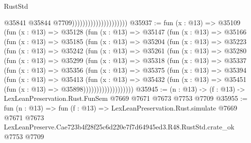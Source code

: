 \begin{lexlean}{RustStd}
\begin{coremodule}
                                              @35841
                                              @35844
                                              @7709)))))))))))))))))))))
@35937 := fun (x : @13) =>
  @35109
    (fun (x : @13) =>
    @35128
      (fun (x : @13) =>
      @35147
        (fun (x : @13) =>
        @35166
          (fun (x : @13) =>
          @35185
            (fun (x : @13) =>
            @35204
              (fun (x : @13) =>
              @35223
                (fun (x : @13) =>
                @35242
                  (fun (x : @13) =>
                  @35261
                    (fun (x : @13) =>
                    @35280
                      (fun (x : @13) =>
                      @35299
                        (fun (x : @13) =>
                        @35318
                          (fun (x : @13) =>
                          @35337
                            (fun (x : @13) =>
                            @35356
                              (fun (x : @13) =>
                              @35375
                                (fun (x : @13) =>
                                @35394
                                  (fun (x : @13) =>
                                  @35413
                                    (fun (x : @13) =>
                                    @35432
                                      (fun (x : @13) =>
                                      @35451 (fun (x : @13) => @35898)))))))))))))))))))
@35945 := (n : @13) -> (f : @13) -> LexLeanPreservation.Rust.FunSem @7669 @7671 @7673 @7753 @7709
@35955 := fun (n : @13) =>
  fun (f : @13) =>
  LexLeanPreservation.Rust.simulate
    @7669
    @7671
    @7673
    LexLeanPreserve.Cae723b4f28f25c6d220e7f7d64945ed3.R48.RustStd.crate_ok
    @7753
    @7709
\end{coremodule}
\end{lexlean}
